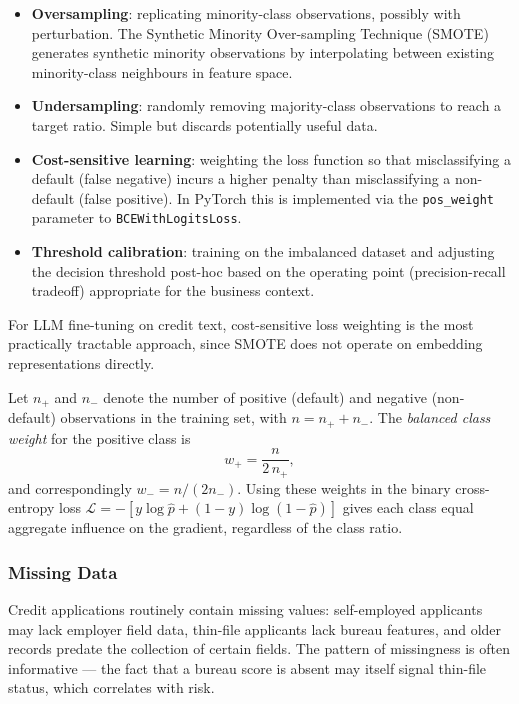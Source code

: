 \begin{context}
\begin{itemize}
  \item \textbf{Oversampling}: replicating minority-class observations, possibly with perturbation. The Synthetic Minority Over-sampling Technique (SMOTE) generates synthetic minority observations by interpolating between existing minority-class neighbours in feature space.
  \item \textbf{Undersampling}: randomly removing majority-class observations to reach a target ratio. Simple but discards potentially useful data.
  \item \textbf{Cost-sensitive learning}: weighting the loss function so that misclassifying a default (false negative) incurs a higher penalty than misclassifying a non-default (false positive). In PyTorch this is implemented via the \texttt{pos\_weight} parameter to \texttt{BCEWithLogitsLoss}.
  \item \textbf{Threshold calibration}: training on the imbalanced dataset and adjusting the decision threshold post-hoc based on the operating point (precision-recall tradeoff) appropriate for the business context.
\end{itemize}

For LLM fine-tuning on credit text, cost-sensitive loss weighting is the most practically tractable approach, since SMOTE does not operate on embedding representations directly.

\begin{definition}
\label{def:class-weight}
Let $n_+$ and $n_-$ denote the number of positive (default) and negative (non-default) observations in the training set, with $n = n_+ + n_-$. The \emph{balanced class weight} for the positive class is
\begin{equation}
  w_+ = \frac{n}{2 \, n_+},
  \label{eq:class-weight}
\end{equation}
and correspondingly $w_- = n / (2 n_-)$. Using these weights in the binary cross-entropy loss $\mathcal{L} = -[y \log \hat{p} + (1-y)\log(1-\hat{p})]$ gives each class equal aggregate influence on the gradient, regardless of the class ratio.
\end{definition}

\subsubsection*{Missing Data}

Credit applications routinely contain missing values: self-employed applicants may lack employer field data, thin-file applicants lack bureau features, and older records predate the collection of certain fields. The pattern of missingness is often informative --- the fact that a bureau score is absent may itself signal thin-file status, which correlates with risk.


\end{context}
